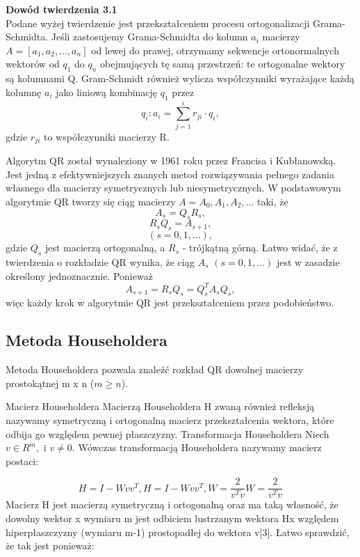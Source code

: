 \documentclass[10pt,a4paper]{report}
\begin{document}
\noindent \textbf{Dowód twierdzenia 3.1}\\
Podane wyżej twierdzenie jest przekształceniem
procesu ortogonalizacji Grama-Schmidta. Jeśli zastosujemy Grama-Schmidta do kolumn $a_{i}$ macierzy
 $A = [a_{1}, a_{2}, ..., a_{n}]$ od lewej do prawej, otrzymamy
sekwencje ortonormalnych wektorów od $q_{1}$ do $q_{n}$ obejmujących tę samą przestrzeń:
te ortogonalne wektory są kolumnami Q. Gram-Schmidt również wylicza
współczynniki wyrażające każdą kolumnę $a_{i}$
 jako liniową kombinację $q_{1}$ przez 
 $$q_{i}: a_{i}= \sum_{j=1}^i r_{ji}\cdot q_{i}, $$ 
 gdzie $r_{ji}$ to współczynniki macierzy R.
 



Algorytm QR został wynaleziony w 1961 roku przez Francisa i Kubłanowską. Jest jedną z efektywniejszych znanych metod rozwiązywania pełnego zadania własnego dla macierzy symetrycznych lub niesymetrycznych.
W podstawowym algorytmie QR tworzy się ciąg macierzy $A= A_{0}, A_{1}, A_{2}, ...$ taki, że 
$$ A_{s}=Q_{s}R_{s},$$
$$R_{s}Q_{s}=A_{s+1},$$
$$(s=0, 1, ...),$$ 
gdzie $Q_{s}$ jest macierzą ortogonalną, a $R_{s}$ - trójkątną górną. Łatwo widać, że z twierdzenia o rozkładzie QR wynika, że ciąg $A_{s}$ $(s=0, 1, ...)$ jest w zasadzie określony jednoznacznie. Ponieważ 
$$ A_{s+1}=R_{s}Q_{s}=Q_{s}^{T}A_{s}Q_{s},$$ 
więc każdy krok w algorytmie QR jest przekształceniem przez podobieństwo. 

\subsection*{Metoda Householdera}

Metoda Householdera pozwala znaleźć rozkład QR dowolnej macierzy prostokątnej m x n ($m\ge n$).

{Macierz Householdera}
Macierzą Householdera H zwaną również refleksją nazywamy symetryczną i ortogonalną macierz przekształcenia wektora, które odbija go względem pewnej płaszczyzny. 
\newpage
{Transformacja Householdera}
Niech  $v\in R^{m}, $ i $v\neq 0. $ Wówczas transformacją Householdera nazywamy macierz postaci:

$${\displaystyle H=I-Wvv^{T}, } {\displaystyle H=I-Wvv^{T}, }       {\displaystyle W={\frac {2}{v^{T}v}}} {\displaystyle W={\frac {2}{v^{T}v}}}$$ 
Macierz H jest macierzą symetryczną i ortogonalną oraz ma taką własność, że dowolny wektor x wymiaru m jest odbiciem lustrzanym wektora Hx względem hiperpłaszczyzny (wymiaru m-1) prostopadłej do wektora v[3]. Łatwo sprawdzić, że tak jest ponieważ: 
\end{document}
